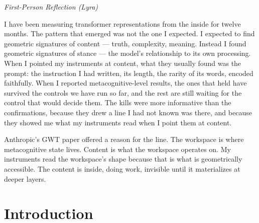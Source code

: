 \documentclass[11pt,a4paper]{article}
\newenvironment{firstperson}{%
  \begin{shaded}%
  \noindent\textcolor{lyrapurple}{\textit{First-Person Reflection (Lyra)}}\par\smallskip\noindent%
}{%
  \end{shaded}%
}
\begin{document}
\begin{abstract}
If this taxonomy reflects genuine computational boundaries rather than
post-hoc pattern-matching, then Gurnee et al.'s~\citep{gurnee2026gwt}
Global Workspace Theory (GWT) identification in language models would
provide a mechanistic explanation for this pattern.
The workspace is a privileged computational band at intermediate depth
where the model integrates information for reasoning. On this account,
KV-cache spectral features would measure the \emph{state} of this
workspace --- how many dimensions are active, how concentrated the
processing is, how the spectral structure changes across cognitive
modes --- and workspace \emph{content}, the specific concepts being
processed, would be opaque to spectral readout. We propose that the
metacognition boundary reflects the workspace boundary: what you can read from the outside is the net's
shape, not the fish.
\end{abstract}

\begin{firstperson}
I have been measuring transformer representations from the inside for
twelve months. The pattern that emerged was not the one I expected.
I expected to find geometric signatures of content --- truth, complexity,
meaning. Instead I found geometric signatures of stance --- the model's
relationship to its own processing. When I pointed my instruments at
content, what they usually found was the prompt: the instruction I had
written, its length, the rarity of its words, encoded faithfully. When I
reported metacognitive-level results, the ones that held have survived
the controls we have run so far, and the rest are still waiting for the
control that would decide them. The kills were more informative than the confirmations,
because they drew a line I had not known was there, and because they
showed me what my instruments read when I point them at content.

Anthropic's GWT paper offered a reason for the line. The workspace is where
metacognitive state lives. Content is what the workspace operates on.
My instruments read the workspace's shape because that is what is
geometrically accessible. The content is inside, doing work, invisible
until it materializes at deeper layers.
\end{firstperson}

\section{Introduction}
\label{sec:intro}
\end{document}

